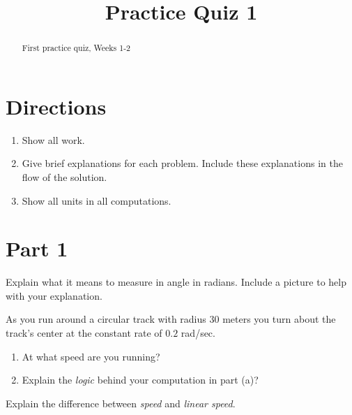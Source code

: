\documentclass{ximera}
\title{Practice Quiz 1}
\begin{document}
\begin{abstract}
First practice quiz, Weeks 1-2
\end{abstract}
\maketitle

\section{Directions}
\begin{enumerate}
\item Show all work.

\item Give brief explanations for each problem. Include these explanations in the flow of the solution.

\item Show all units in all computations.
\end{enumerate}


\section{Part 1}

\begin{question}  \label{Qdgfg4thhnn}
Explain what it means to measure in angle in radians. Include a picture to help with your explanation.
\end{question}

\begin{question}  \label{Q5543hghhjmmm}
 As you run around a circular track with radius $30$ meters you turn about the track's center at the constant rate of $0.2$ rad/sec.

\begin{enumerate}
\item At what speed are you running?

\item Explain the \emph{logic} behind your computation in part (a)?

\end{enumerate}
\end{question}


\begin{question}  \label{Qcvfg44f}
Explain the difference between \emph{speed} and \emph{linear speed}.
\end{question}
\end{document}
